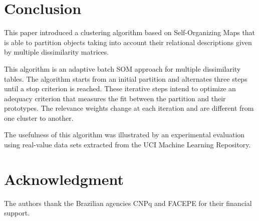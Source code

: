 \documentclass[10pt, conference, compsocconf]{IEEEtran}
\begin{document}
\section{Conclusion}\label{sec:conclusion}
This paper introduced a clustering algorithm based on Self-Organizing Maps that is able to partition objects taking into account their relational descriptions given by multiple dissimilarity matrices. 

This algorithm is an adaptive batch SOM approach for multiple dissimilarity tables. The algorithm starts from an initial partition and alternates three steps until a stop criterion is reached. 
These iterative steps intend to optimize an adequacy criterion that measures the fit between the partition and their prototypes. The relevance weights change at each iteration and are different from one cluster to another. 

The usefulness of this algorithm was illustrated by an experimental evaluation using real-value data sets extracted from the UCI Machine Learning Repository.



\section*{Acknowledgment}
The authors thank the Brazilian agencies CNPq and FACEPE for their financial support.







%
%
\end{document}
